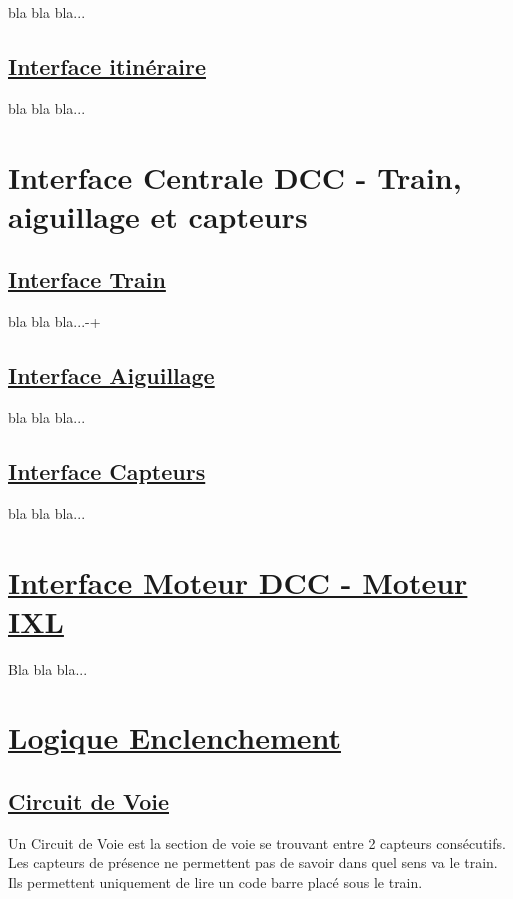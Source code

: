 bla bla bla...

\subsection{\underline{Interface itinéraire}}
\label{sec:ihm_iti}

bla bla bla...



\section{Interface Centrale DCC - Train, aiguillage et capteurs}
\label{sec:int_dcc}

\subsection{\underline{Interface Train}}
\label{sec:int_train}

bla bla bla...-+

\subsection{\underline{Interface Aiguillage}}
\label{sec:int_aig}

bla bla bla...

\subsection{\underline{Interface Capteurs}}
\label{sec:int_cap}

bla bla bla...


\newpage
\section{\underline{Interface Moteur DCC - Moteur IXL}}
\label{sec:int_ixl}
Bla bla bla...


\newpage
\section{\underline{Logique Enclenchement}}
\label{sec:log_enc}

\subsection{\underline{Circuit de Voie}}
\label{sec:CdV}

Un Circuit de Voie est la section de voie se trouvant entre 2 capteurs
consécutifs. Les capteurs de présence ne permettent pas de savoir dans
quel sens va le train. Ils permettent uniquement de lire un code barre
placé sous le train.  

